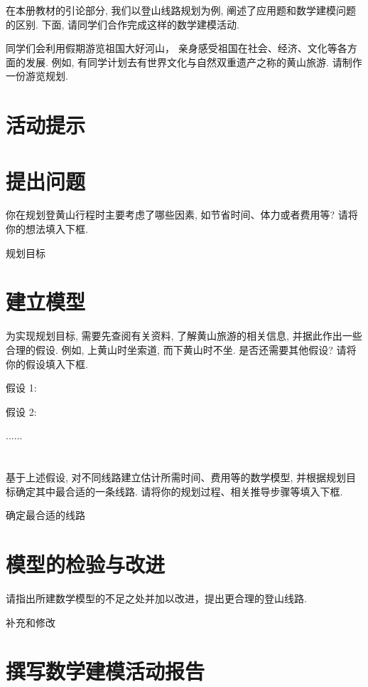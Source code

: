 \documentclass[10pt]{article}
\begin{document}
在本册教材的引论部分, 我们以登山线路规划为例, 阐述了应用题和数学建模问题的区别. 下面, 请同学们合作完成这样的数学建模活动.

同学们会利用假期游览祖国大好河山， 亲身感受祖国在社会、经济、文化等各方面的发展. 例如, 有同学计划去有世界文化与自然双重遗产之称的黄山旅游. 请制作一份游览规划.

\section*{活动提示}

\section*{提出问题}

你在规划登黄山行程时主要考虑了哪些因素, 如节省时间、体力或者费用等? 请将你的想法填入下框.

规划目标

\section*{建立模型}

为实现规划目标, 需要先查阅有关资料, 了解黄山旅游的相关信息, 并据此作出一些合理的假设. 例如, 上黄山时坐索道, 而下黄山时不坐. 是否还需要其他假设? 请将你的假设填入下框.

假设 1:

假设 2:

......

\section*{}

基于上述假设, 对不同线路建立估计所需时间、费用等的数学模型, 并根据规划目标确定其中最合适的一条线路. 请将你的规划过程、相关推导步骤等填入下框.

确定最合适的线路

\section*{模型的检验与改进}

请指出所建数学模型的不足之处并加以改进，提出更合理的登山线路.

补充和修改

\section*{撰写数学建模活动报告}
\end{document}

